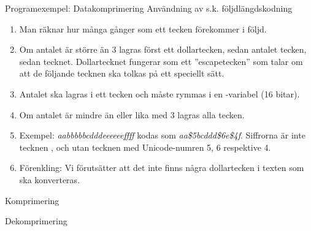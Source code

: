 \documentclass{lecturenotes}
\begin{document}
\begin{Slide}{Programexempel: Datakomprimering}
Användning av s.k. följdlängdskodning\\
\begin{enumerate} \footnotesize
 \item Man räknar hur många gånger som ett tecken förekommer i följd.
 \item Om antalet är större än 3 lagras först ett dollartecken, sedan antalet tecken, sedan tecknet. Dollartecknet fungerar som ett ''escapetecken'' som talar om att de följande tecknen ska tolkas på ett speciellt sätt. 
 \item Antalet ska lagras i ett tecken och måste rymmas i en -variabel (16 bitar).
 \item Om antalet är mindre än eller lika med 3 lagras alla tecken.
 \item Exempel: \textsl{aabbbbbcdddeeeeeeffff} kodas som \textsl{aa\$5bcddd\$6e\$4f}. Siffrorna är inte tecknen ,  och  utan tecknen med Unicode-numren 5, 6 respektive 4.
\item Förenkling: Vi förutsätter att det inte finns några dollartecken i texten som ska konverteras.
\end{enumerate}
\end{Slide} 

\begin{Slide}{Komprimering}

\end{Slide} 

\begin{Slide}{Dekomprimering}

\end{Slide} 
\end{document}
